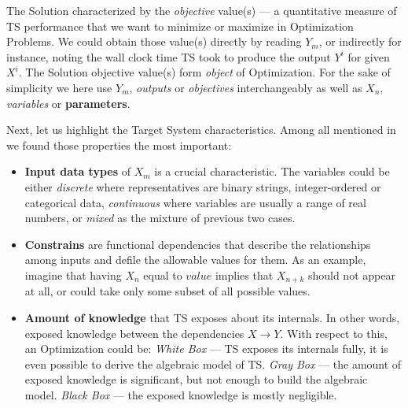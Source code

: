 The Solution characterized by the \textit{objective} value(s) — a quantitative measure of TS performance that we want to minimize or maximize in Optimization Problems. 
We could obtain those value(s) directly by reading $Y_m$, or indirectly for instance, noting the wall clock time TS took to produce the output $Y^i$ for given $X^i$. 
The Solution objective value(s) form \textit{object} of Optimization. 
For the sake of simplicity we here use $Y_m$, \textit{outputs} or \textit{objectives} interchangeably as well as $X_n$, \textit{variables} or \textbf{parameters}.


Next, let us highlight the Target System characteristics.
Among all mentioned in \cite{biegler2004retrospective,figueira2014hybrid,deb2014multi,amaran2016simulation} we found those properties the most important:
\begin{itemize}[itemsep=8pt]
	\item \textbf{Input data types} of $X_m$ is a crucial characteristic. The variables could be either \textit{discrete} where representatives are binary strings, integer-ordered or categorical data, \textit{continuous} where variables are usually a range of real numbers, or \textit{mixed} as the mixture of previous two cases.

	\item \textbf{Constrains} are functional dependencies that describe the relationships among inputs and defile the allowable values for them. As an example, imagine that having $X_n$ equal to $value$ implies that $X_{n + k}$ should not appear at all, or could take only some subset of all possible values.

	\item \textbf{Amount of knowledge} that TS exposes about its internals. In other words, exposed knowledge between the dependencies $X \rightarrow Y$. With respect to this, an Optimization could be: \textit{White Box} — TS exposes its internals fully, it is even possible to derive the algebraic model of TS.
	\textit{Gray Box} — the amount of exposed knowledge is significant, but not enough to build the algebraic model.
	\textit{Black Box} — the exposed knowledge is mostly negligible.



\end{itemize}

